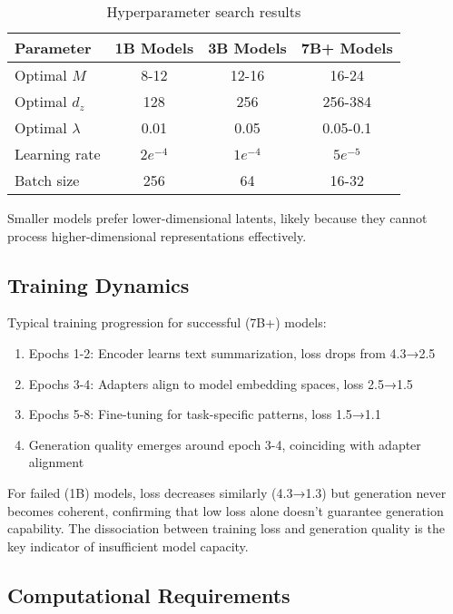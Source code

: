 \documentclass{article}
\begin{document}
\begin{table}[h]
\caption{Hyperparameter search results}
\vskip 0.15in
\begin{center}
\begin{small}
\begin{tabular}{lccc}
\toprule
Parameter & 1B Models & 3B Models & 7B+ Models \\
\midrule
Optimal $M$ & 8-12 & 12-16 & 16-24 \\
Optimal $d_z$ & 128 & 256 & 256-384 \\
Optimal $\lambda$ & 0.01 & 0.05 & 0.05-0.1 \\
Learning rate & $2e^{-4}$ & $1e^{-4}$ & $5e^{-5}$ \\
Batch size & 256 & 64 & 16-32 \\
\bottomrule
\end{tabular}
\end{small}
\end{center}
\end{table}

Smaller models prefer lower-dimensional latents, likely because they cannot process higher-dimensional representations effectively.

\subsection{Training Dynamics}

Typical training progression for successful (7B+) models:
\begin{enumerate}
\item Epochs 1-2: Encoder learns text summarization, loss drops from 4.3→2.5
\item Epochs 3-4: Adapters align to model embedding spaces, loss 2.5→1.5
\item Epochs 5-8: Fine-tuning for task-specific patterns, loss 1.5→1.1
\item Generation quality emerges around epoch 3-4, coinciding with adapter alignment
\end{enumerate}

For failed (1B) models, loss decreases similarly (4.3→1.3) but generation never becomes coherent, confirming that low loss alone doesn't guarantee generation capability. The dissociation between training loss and generation quality is the key indicator of insufficient model capacity.

\subsection{Computational Requirements}
\end{document}
